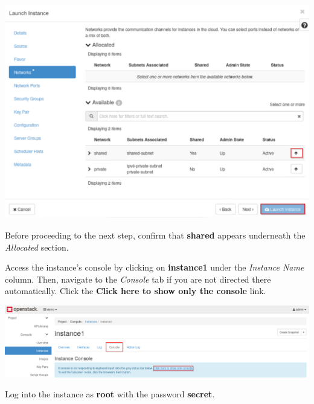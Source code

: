 \documentclass[letterpaper, 12pt]{article}
\begin{document}
\begin{enumerate}
\begin{labstep}
        \begin{center}
            \includegraphics[width=\linewidth]{images/part1/step8.png}
        \end{center}
    \end{labstep}

    \begin{stopbox}
        Before proceeding to the next step, confirm that \textbf{shared} appears underneath the \textit{Allocated} section.
    \end{stopbox}

    \begin{labstep}
        Access the instance's console by clicking on \textbf{instance1} under the \textit{Instance Name} column.
        Then, navigate to the \textit{Console} tab if you are not directed there automatically.
        Click the \textbf{Click here to show only the console} link.

        \begin{center}
            \includegraphics[width=\linewidth]{images/part1/step9.png}
        \end{center}
    \end{labstep}

    \begin{labstep}
        Log into the instance as \textbf{root} with the password \textbf{secret}.


\end{labstep}
\end{enumerate}
\end{document}
